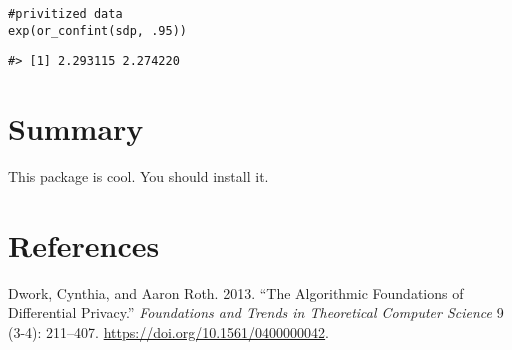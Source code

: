 \begin{verbatim}
#privitized data
exp(or_confint(sdp, .95))
\end{verbatim}

\begin{verbatim}
#> [1] 2.293115 2.274220
\end{verbatim}

\hypertarget{summary}{%
\section{Summary}\label{summary}}

This package is cool. You should install it.

\hypertarget{references}{%
\section*{References}\label{references}}

\hypertarget{refs}{}
\begin{CSLReferences}{1}{0}
\leavevmode{}%
Dwork, Cynthia, and Aaron Roth. 2013. {``The Algorithmic Foundations of Differential Privacy.''} \emph{Foundations and Trends{\textregistered} in Theoretical Computer Science} 9 (3-4): 211--407. \url{https://doi.org/10.1561/0400000042}.

\end{CSLReferences}



\address{%
Jordan A. Awan\\
Purdue University\\%
Department of Statistics\\ West Lafayette, IN 47907\\
%
\url{https://www.britannica.com/animal/quokka}\\%
%
\href{mailto:jawan@purdue.edu}{\nolinkurl{jawan@purdue.edu}}%
}

\address{%
Kevin Eng\\
Rutgers University\\%
Department of Statistics\\ Piscataway, NJ 08854\\
%
\url{https://www.britannica.com/animal/quokka}\\%
%
\href{mailto:ke157@stat.rutgers.edu}{\nolinkurl{ke157@stat.rutgers.edu}}%
}

\address{%
Robin Gong\\
Rutgers University\\%
Department of Statistics\\ Piscataway, NJ 08854\\
%
\url{https://www.britannica.com/animal/quokka}\\%
%
\href{mailto:ruobin.gong@rutgers.edu}{\nolinkurl{ruobin.gong@rutgers.edu}}%
}

